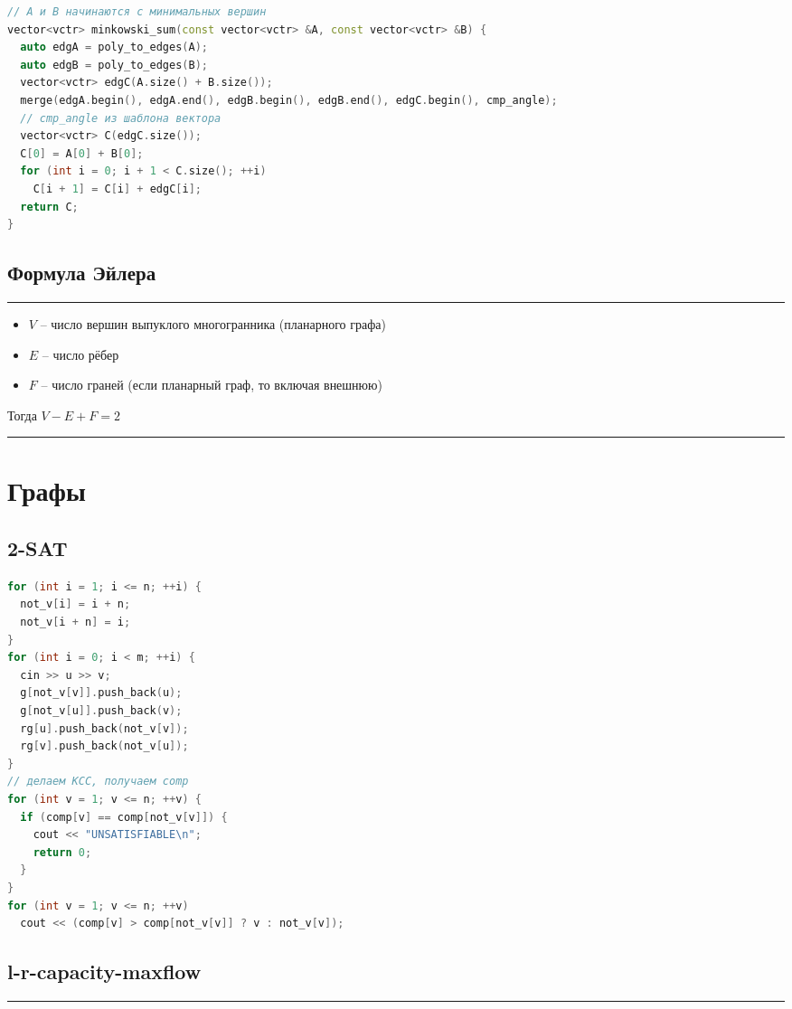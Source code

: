 \documentclass[9pt,a4paper,landscape,twosided]{extarticle}
\begin{document}
\begin{multicols*}{3}
\begin{lstlisting}[language=C++]
// A и B начинаются с минимальных вершин
vector<vctr> minkowski_sum(const vector<vctr> &A, const vector<vctr> &B) {
  auto edgA = poly_to_edges(A);
  auto edgB = poly_to_edges(B);
  vector<vctr> edgC(A.size() + B.size());
  merge(edgA.begin(), edgA.end(), edgB.begin(), edgB.end(), edgC.begin(), cmp_angle);
  // cmp_angle из шаблона вектора
  vector<vctr> C(edgC.size());
  C[0] = A[0] + B[0];
  for (int i = 0; i + 1 < C.size(); ++i)
    C[i + 1] = C[i] + edgC[i];
  return C;
}

\end{lstlisting}

\subsection{Формула Эйлера}
\noindent\rule{\linewidth}{0.15mm}
\begin{itemize}
    \item $V$ -- число вершин выпуклого многогранника (планарного графа)
    \item $E$ -- число рёбер
    \item $F$ -- число граней (если планарный граф, то включая внешнюю)
\end{itemize}
Тогда $V-E+F=2$

\noindent\rule{\linewidth}{0.15mm}

\section{Графы}

\subsection{2-SAT}
\begin{lstlisting}[language=C++]
for (int i = 1; i <= n; ++i) {
  not_v[i] = i + n;
  not_v[i + n] = i;
}
for (int i = 0; i < m; ++i) {
  cin >> u >> v;
  g[not_v[v]].push_back(u);
  g[not_v[u]].push_back(v);
  rg[u].push_back(not_v[v]);
  rg[v].push_back(not_v[u]);
}
// делаем КСС, получаем comp
for (int v = 1; v <= n; ++v) {
  if (comp[v] == comp[not_v[v]]) {
    cout << "UNSATISFIABLE\n";
    return 0;
  }
}
for (int v = 1; v <= n; ++v)
  cout << (comp[v] > comp[not_v[v]] ? v : not_v[v]);
\end{lstlisting}

\subsection{l-r-capacity-maxflow}
\noindent\rule{\linewidth}{0.15mm}

\end{multicols*}
\end{document}
